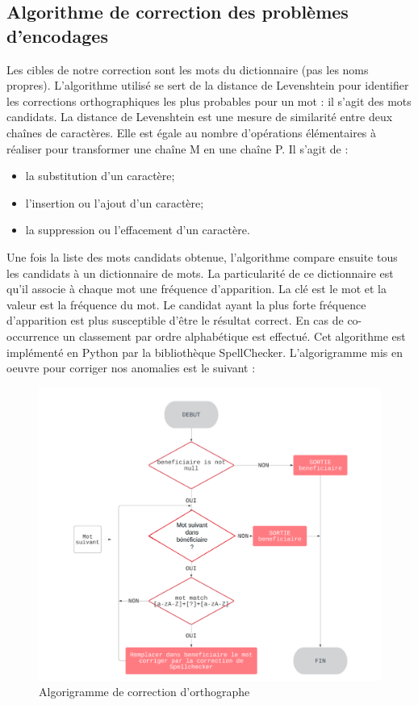 \subsection{Algorithme de correction des probl\`emes d'encodages}
Les cibles de notre correction sont les mots du dictionnaire (pas les noms propres). L'algorithme utilis\'e se sert de la distance de Levenshtein pour identifier les corrections orthographiques les plus probables pour un mot : il s'agit des mots candidats. La distance de Levenshtein est une mesure de similarit\'e entre deux chaînes de caract\`eres. Elle est \'egale au nombre d'op\'erations \'el\'ementaires \`a r\'ealiser  pour transformer une chaîne M en une chaîne P. Il s'agit de :
\begin{itemize}[parsep=0cm,itemsep=0cm]
\item la substitution d'un caract\`ere;
\item l'insertion  ou l'ajout d'un caract\`ere;
\item la suppression ou l'effacement d'un caract\`ere.
\end{itemize}
Une fois la liste des mots candidats obtenue, l'algorithme compare ensuite tous les candidats à un dictionnaire de mots. La particularit\'e de ce dictionnaire est qu'il associe \`a chaque mot une fr\'equence d'apparition. La cl\'e est le mot et la valeur est la fr\'equence du mot. Le candidat ayant la plus forte fr\'equence d'apparition est plus susceptible d'être le résultat correct. En cas de co-occurrence un classement par ordre alphab\'etique est effectu\'e. Cet algorithme est impl\'ement\'e en Python par la biblioth\`eque SpellChecker. L'algorigramme mis en oeuvre pour corriger nos anomalies est le suivant : 
\begin{figure}[H]
    \begin{center}
      \includegraphics[scale=0.45]{Main/Static/Spell_checker_corr.png} 
      \end{center}
        \caption{Algorigramme de correction d'orthographe}  \label{fig:xray}
\end{figure}

